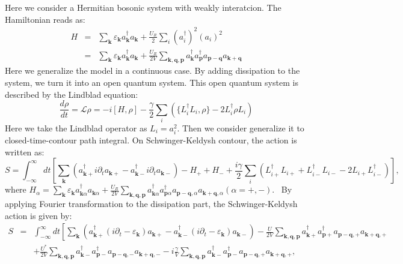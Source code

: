 \documentclass[aps,onecolumn,superscriptaddress,notitlepage,longbibliography]{revtex4-1}
\begin{document}
Here we consider a Hermitian bosonic system with weakly interatcion. The
Hamiltonian reads as:
\begin{eqnarray}
  H & = & \sum_{\mathbf{k}} \varepsilon_{\mathbf{k}}
  a_{\mathbf{k}}^{\dagger} a_{\mathbf{k}} + \frac{U_R}{2} \sum_i
  (a_i^{\dagger})^2 (a_i)^2 \nonumber\\
  & = & \sum_{\mathbf{k}} \varepsilon_{\mathbf{k}}
  a_{\mathbf{k}}^{\dagger} a_{\mathbf{k}} + \frac{U_R}{2 V}
  \sum_{\mathbf{k}, \mathbf{q}, \mathbf{p}} a_{\mathbf{k}}^{\dagger}
  a_{\mathbf{p}}^{\dagger} a_{\mathbf{p}-\mathbf{q}}
  a_{\mathbf{k}+\mathbf{q}} \label{Hamiltonian} 
\end{eqnarray}
Here we generalize the model in a continuous case. By adding dissipation to
the system, we turn it into an open quantum system. This open quantum system
is described by the Lindblad equation:
\begin{equation}
  \frac{d \rho}{d t} =\mathcal{L} \rho = - i [H, \rho] - \frac{\gamma}{2}
  \sum_i (\{ L_i^{\dagger} L_i, \rho \} - 2 L_i^{\dagger} \rho L_i)
  \label{Lindbland}
\end{equation}
Here we take the Lindblad operator as $L_i = a_i^2$. Then we consider
generalize it to closed-time-contour path integral. On Schwinger-Keldysh
contour, the action is written as:
\begin{equation}
  S = \int_{- \infty}^{\infty} d t \left[ \sum_{\mathbf{k}}
  (a^{\dagger}_{\mathbf{k}+} i \partial_t a_{\mathbf{k}+} -
  a^{\dagger}_{\mathbf{k}-} i \partial_t a_{\mathbf{k}-}) - H_+ + H_- +
  \frac{i \gamma}{2} \sum_i (L_{i +}^{\dagger} L_{i +} + L_{i -}^{\dagger}
  L_{i -} - 2 L_{i +} L_{i -}^{\dagger}) \right],
\end{equation}
where $H_{\alpha} = \sum_{\mathbf{k}} \varepsilon_{\mathbf{k}}
a_{\mathbf{k} \alpha}^{\dagger} a_{\mathbf{k} \alpha} + \frac{U_R}{2 V}
\sum_{\mathbf{k}, \mathbf{q}, \mathbf{p}} a_{\mathbf{k}
\alpha}^{\dagger} a_{\mathbf{p} \alpha}^{\dagger}
a_{\mathbf{p}-\mathbf{q}, \alpha} a_{\mathbf{k}+\mathbf{q}, \alpha}
(\alpha = +, -)$. \ By applying Fourier transformation to the dissipation
part, the Schwinger-Keldysh action is given by:
\begin{eqnarray}
  S & = & \int_{- \infty}^{\infty} d t \left[ \sum_{\mathbf{k}}
  (a^{\dagger}_{\mathbf{k}+} (i \partial_t - \varepsilon_{\mathbf{k}})
  a_{\mathbf{k}+} - a^{\dagger}_{\mathbf{k}-} (i \partial_t -
  \varepsilon_{\mathbf{k}}) a_{\mathbf{k}-}) - \frac{U}{2 V}
  \sum_{\mathbf{k}, \mathbf{q}, \mathbf{p}} a_{\mathbf{k}+}^{\dagger}
  a_{\mathbf{p}+}^{\dagger} a_{\mathbf{p}-\mathbf{q}, +}
  a_{\mathbf{k}+\mathbf{q}, +} \right. \nonumber\\
  &  & + \frac{U^{\ast}}{2 V} \sum_{\mathbf{k}, \mathbf{q}, \mathbf{p}}
  a_{\mathbf{k}-}^{\dagger} a_{\mathbf{p}-}^{\dagger}
  a_{\mathbf{p}-\mathbf{q}, -} a_{\mathbf{k}+\mathbf{q}, -} - i
  \frac{\gamma}{V} \sum_{\mathbf{k}, \mathbf{q}, \mathbf{p}}
  a_{\mathbf{k}-}^{\dagger} a_{\mathbf{p}-}^{\dagger}
  a_{\mathbf{p}-\mathbf{q}, +} a_{\mathbf{k}+\mathbf{q}, +},
\end{eqnarray}
\end{document}
